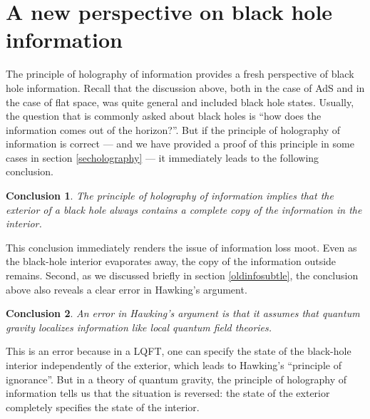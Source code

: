 \documentclass[12pt]{article}
\newtheorem{lesson}{Conclusion}
\begin{document}
\section{A new perspective on black hole information \label{secresolveinfo}}
The principle of holography of information provides a fresh perspective of black hole information. Recall that the discussion above, both in the case of AdS and in the case of flat space, was
quite general and included black hole states. Usually, the question that is commonly asked about black holes is  ``how does the information comes out of the horizon?''. But if the principle of holography of information is correct --- and we have provided a proof of this principle in some cases in section \ref{secholography} --- it immediately leads to the following conclusion.
\begin{lesson}
\label{lessonalwaysoutside}
The principle of holography of information  implies that the exterior of a black hole always contains a complete copy of the information in the interior.
\end{lesson}
This conclusion  immediately renders the issue of information loss moot. Even as the black-hole interior evaporates away, the copy of the information outside remains.  Second, as we discussed briefly in section \ref{oldinfosubtle}, the conclusion above also reveals a clear error in Hawking's argument.
\begin{lesson}
\label{lessonhawkerror}
An error in Hawking's argument is that it assumes that quantum gravity localizes information like local quantum field theories.
\end{lesson}
This is an error because in a LQFT, one can specify the state of the black-hole interior independently of the exterior, which leads to Hawking's ``principle of ignorance''. But in a theory of quantum gravity, the principle of holography of information tells us that the situation is reversed: the state of the exterior completely specifies the state of the interior.
\end{document}
